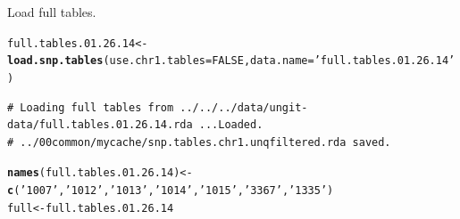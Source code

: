 \documentclass{article}\usepackage[]{graphicx}\usepackage[]{color}
\makeatletter
\newcommand{\hlnum}[1]{\textcolor[rgb]{0.686,0.059,0.569}{#1}}%
\newcommand{\hlstr}[1]{\textcolor[rgb]{0.192,0.494,0.8}{#1}}%
\newcommand{\hlstd}[1]{\textcolor[rgb]{0.345,0.345,0.345}{#1}}%
\newcommand{\hlkwb}[1]{\textcolor[rgb]{0.69,0.353,0.396}{#1}}%
\newcommand{\hlkwc}[1]{\textcolor[rgb]{0.333,0.667,0.333}{#1}}%
\newcommand{\hlkwd}[1]{\textcolor[rgb]{0.737,0.353,0.396}{\textbf{#1}}}%
\newenvironment{kframe}{%
 \def\at@end@of@kframe{}%
 \ifinner\ifhmode%
  \def\at@end@of@kframe{\end{minipage}}%
  \begin{minipage}{\columnwidth}%
 \fi\fi%
 \def\FrameCommand##1{\hskip\@totalleftmargin \hskip-\fboxsep
 \colorbox{shadecolor}{##1}\hskip-\fboxsep
     \hskip-\linewidth \hskip-\@totalleftmargin \hskip\columnwidth}%
 \MakeFramed {\advance\hsize-\width
   \@totalleftmargin\z@ \linewidth\hsize
   \@setminipage}}%
 {\par\unskip\endMakeFramed%
 \at@end@of@kframe}
\newenvironment{knitrout}{}{} %
\makeatother
\begin{document}
Load full tables.

\begin{knitrout}\footnotesize
{}\color{fgcolor}\begin{kframe}
\begin{alltt}
\hlstd{full.tables.01.26.14} \hlkwb{<-} \hlkwd{load.snp.tables}\hlstd{(}\hlkwc{use.chr1.tables} \hlstd{=} \hlnum{FALSE}\hlstd{,} \hlkwc{data.name}\hlstd{=}\hlstr{'full.tables.01.26.14'}\hlstd{)}
\end{alltt}
\begin{verbatim}
# Loading full tables from ../../../data/ungit-data/full.tables.01.26.14.rda ...Loaded.
# ../00common/mycache/snp.tables.chr1.unqfiltered.rda saved.
\end{verbatim}
\begin{alltt}
\hlkwd{names}\hlstd{(full.tables.01.26.14)} \hlkwb{<-}  \hlkwd{c}\hlstd{(}\hlstr{'1007'}\hlstd{,}\hlstr{'1012'}\hlstd{,}\hlstr{'1013'}\hlstd{,}\hlstr{'1014'}\hlstd{,}\hlstr{'1015'}\hlstd{,}\hlstr{'3367'}\hlstd{,}\hlstr{'1335'}\hlstd{)}
\hlstd{full} \hlkwb{<-} \hlstd{full.tables.01.26.14}
\end{alltt}
\end{kframe}
\end{knitrout}
\end{document}
